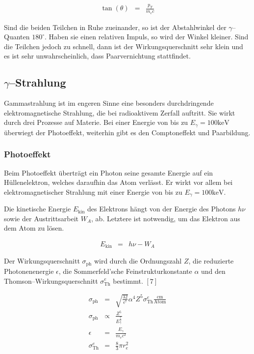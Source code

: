 \documentclass[12pt,a4paper]{scrartcl}
\numberwithin{equation}{section} %
\newcommand{\pu}[1]{\ensuremath{\mathrm{#1}}}
\renewcommand{\[}{} %
\renewcommand{\]}{\noindent} %
\begin{document}
\[
\begin{eqnarray}
    \tan(\theta) &=& \frac{p_T}{m_ec}
\end{eqnarray}
\]

Sind die beiden Teilchen in Ruhe zueinander, so ist der Abstahlwinkel
der \(\gamma\)--Quanten \(\pu{180^\circ}\). Haben sie einen relativen
Impuls, so wird der Winkel kleiner. Sind die Teilchen jedoch zu schnell,
dann ist der Wirkungsquerschnitt sehr klein und es ist sehr
unwahrscheinlich, dass Paarvernichtung stattfindet.

\hypertarget{gammastrahlung}{%
\subsection{\texorpdfstring{\(\gamma\)--Strahlung}{\textbackslash gamma--Strahlung}}\label{gammastrahlung}}

Gammastrahlung ist im engeren Sinne eine besonders durchdringende
elektromagnetische Strahlung, die bei radioaktivem Zerfall auftritt. Sie
wirkt durch drei Prozesse auf Materie. Bei einer Energie von bis zu
\(E_\gamma = \pu{100 keV}\) überwiegt der Photoeffekt, weiterhin gibt es
den Comptoneffekt und Paarbildung.

\hypertarget{photoeffekt}{%
\subsubsection{Photoeffekt}\label{photoeffekt}}

Beim Photoeffekt überträgt ein Photon seine gesamte Energie auf ein
Hüllenelektron, welches daraufhin das Atom verlässt. Er wirkt vor allem
bei elektromagnetischer Strahlung mit einer Energie von bis zu
\(E_\gamma = \pu{100 keV}\).

Die kinetische Energie \(E_\mathrm{kin}\) des Elektrons hängt von der
Energie des Photons \(h\nu\) sowie der Austrittsarbeit \(W_A\), ab.
Letztere ist notwendig, um das Elektron aus dem Atom zu lösen.

\[
\begin{eqnarray}
    E_\mathrm{kin} &=& h\nu - W_A
\end{eqnarray}
\]

Der Wirkungsquerschnitt \(\sigma_\mathrm{ph}\) wird durch die
Ordnungszahl \(Z\), die reduzierte Photonenenergie \(\epsilon\), die
Sommerfeld'sche Feinstrukturkonstante \(\alpha\) und den
Thomson--Wirkungsquerschnitt \(\sigma_\mathrm{Th}^e\) bestimmt. \([7]\)

\[
\begin{eqnarray}
    \sigma_\mathrm{ph}
        &=& \sqrt{\frac{32}{\epsilon^7}}\alpha^4 Z^5
            \sigma_\mathrm{Th}^e \pu{\frac{cm}{Atom}} \\
    \sigma_\mathrm{ph}
        &\propto& \frac{Z^5}{E_\gamma^{\frac{7}{2}}} \\
    \epsilon &=& \frac{E_\gamma}{m_ec^2} \\
    \sigma_\mathrm{Th}^e &=& \frac{8}{3} \pi r_e^2
\end{eqnarray}
\]
\end{document}
